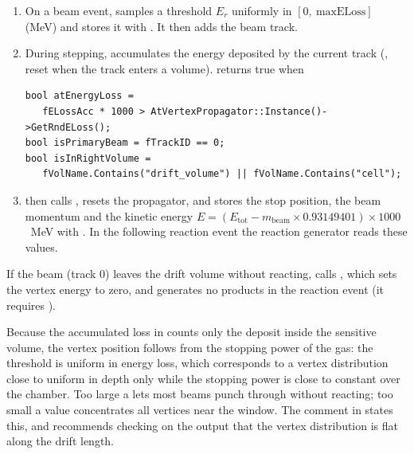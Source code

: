 \begin{enumerate}
  \item On a beam event,  samples a threshold
    $E_r$ uniformly in $[0,\ \mathrm{maxELoss}]$ (MeV) and stores it with
    . It then adds the beam track.
  \item During stepping,  accumulates the energy deposited by the current track
    (, reset when the track enters a volume). 
    returns true when
\begin{verbatim}
bool atEnergyLoss =
   fELossAcc * 1000 > AtVertexPropagator::Instance()->GetRndELoss();
bool isPrimaryBeam = fTrackID == 0;
bool isInRightVolume =
   fVolName.Contains("drift_volume") || fVolName.Contains("cell");
\end{verbatim}
  \item {} then calls , resets the
    propagator, and stores the stop position, the beam momentum and the kinetic energy
    $E = (E_\mathrm{tot} - m_\mathrm{beam}\times 0.93149401)\times1000$~MeV with
    . In the following reaction event the reaction generator reads these values.
\end{enumerate}

If the beam (track 0) leaves the drift volume without reacting,  calls
, which sets the vertex energy to zero, and  generates no
products in the reaction event (it requires ).

Because the accumulated loss in  counts only the deposit inside the sensitive
volume, the vertex position follows from the stopping power of the gas: the threshold is uniform in
energy loss, which corresponds to a vertex distribution close to uniform in depth only while the
stopping power is close to constant over the chamber. Too large a  lets most beams
punch through without reacting; too small a value concentrates all vertices near the window. The
comment in  states this, and recommends checking on the output that the vertex
distribution is flat along the drift length.

